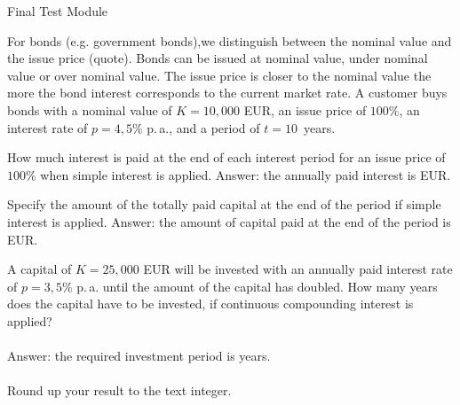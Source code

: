 
\begin{MTest}{Final Test Module }


\begin{MExercise}
For bonds (e.g. government bonds),we distinguish between the nominal value and the issue price (quote).
Bonds can be issued at nominal value, under nominal value or over nominal value. The issue price is closer to the 
nominal value the more the bond interest corresponds to the current market rate. A customer buys bonds 
with a nominal value of $K=10{,}000$ EUR, an issue price of $100\%$, an interest rate of $p=4,5\%$ p.\,a., and 
a period of $t=10$~years. 

\begin{MExerciseItems}
\item{How much interest is paid at the end of each interest period for an issue price of $100\%$
when simple interest is applied. Answer: the annually paid interest is  EUR.}
\item{Specify the amount of the totally paid capital at the end of the period if simple interest is applied.
Answer: the amount of capital paid at the end of the period is  EUR.}
\end{MExerciseItems}
\end{MExercise}

\begin{MExercise}
A capital of $K=25{,}000$ EUR will be invested with an annually paid interest rate of  $p=3,5\%$ p.\,a. until the amount of the capital has doubled. How many years does the capital have to be 
invested, if continuous compounding interest is applied?
\ \\ \ \\
Answer: the required investment period is  years.
\ \\ \ \\
Round up your result to the text integer.
\end{MExercise}


\end{MTest}
